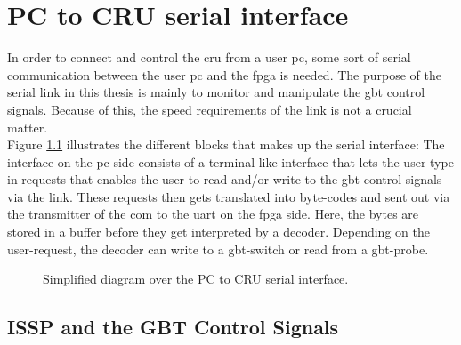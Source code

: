 \documentclass[main.tex]{subfiles}
\begin{document}
\chapter{PC to CRU serial interface} \label{chap:sercom}

In order to connect and control the \gls{cru} from a user \acrshort{pc}, some sort of serial communication between the user \acrshort{pc} and the \gls{fpga} is needed. The purpose of the serial link in this thesis is mainly to monitor and manipulate the \gls{gbt} control signals. Because of this, the speed requirements of the link is not a crucial matter. \\
Figure \ref{fig:sergui} illustrates the different blocks that makes up the serial interface: The interface on the \gls{pc} side consists of a terminal-like interface that lets the user type in requests that enables the user to read and/or write to the \gls{gbt} control signals via the link. These requests then gets translated into byte-codes and sent out via the transmitter of the \gls{com} to the \gls{uart} on the fpga side. Here, the bytes are stored in a buffer before they get interpreted by a decoder. Depending on the user-request, the decoder can write to a \gls{gbt}-switch or read from a \gls{gbt}-probe.

\begin{figure}[H] %

\caption{Simplified diagram over the PC to CRU serial interface.}
\label{fig:sergui}
\end{figure}

\section{ISSP and the GBT Control Signals}
\end{document}
